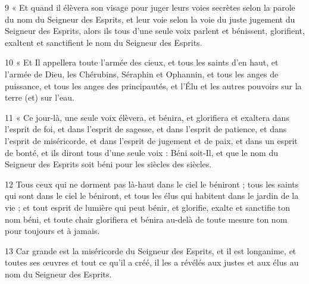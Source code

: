 \par 9 « Et quand il élèvera son visage pour juger leurs voies secrètes selon la parole du nom du Seigneur des Esprits, et leur voie selon la voie du juste jugement du Seigneur des Esprits, alors ils tous d’une seule voix parlent et bénissent, glorifient, exaltent et sanctifient le nom du Seigneur des Esprits.
\par 10 « Et Il appellera toute l'armée des cieux, et tous les saints d'en haut, et l'armée de Dieu, les Chérubins, Séraphin et Ophannin, et tous les anges de puissance, et tous les anges des principautés, et l'Élu et les autres pouvoirs sur la terre (et) sur l'eau.
\par 11 « Ce jour-là, une seule voix élèvera, et bénira, et glorifiera et exaltera dans l'esprit de foi, et dans l'esprit de sagesse, et dans l'esprit de patience, et dans l'esprit de miséricorde, et dans l'esprit de jugement et de paix, et dans un esprit de bonté, et ils diront tous d’une seule voix : Béni soit-Il, et que le nom du Seigneur des Esprits soit béni pour les siècles des siècles.
\par 12 Tous ceux qui ne dorment pas là-haut dans le ciel le béniront ; tous les saints qui sont dans le ciel le béniront, et tous les élus qui habitent dans le jardin de la vie ; et tout esprit de lumière qui peut bénir, et glorifie, exalte et sanctifie ton nom béni, et toute chair glorifiera et bénira au-delà de toute mesure ton nom pour toujours et à jamais.
\par 13 Car grande est la miséricorde du Seigneur des Esprits, et il est longanime, et toutes ses œuvres et tout ce qu'il a créé, il les a révélés aux justes et aux élus au nom du Seigneur des Esprits.


